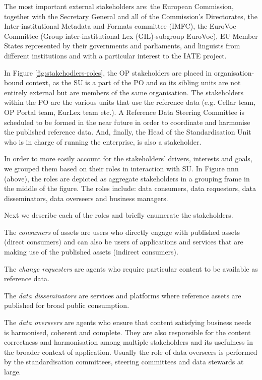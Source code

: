 	The most important external stakeholders are: the European Commission, together with the Secretary General and all of the Commission’s Directorates, the Inter-institutional Metadata and Formats committee (IMFC), the EuroVoc Committee (Group inter-institutional Lex (GIL)-subgroup EuroVoc), EU Member States represented by their governments and parliaments, and linguists from different institutions and with a particular interest to the IATE project.
	 
	In Figure \ref{fig:stakehodlers-roles}, the OP stakeholders are placed in organisation-bound context, as the SU is a part of the PO and so its sibling units are not entirely external but are members of the same organisation. The stakeholders within the PO are the various units that use the reference data (e.g. Cellar team, OP Portal team, EurLex team etc.). A Reference Data Steering Committee is scheduled to be formed in the near future in order to coordinate and harmonise the published reference data. And, finally, the Head of the Standardisation Unit who is in charge of running the enterprise, is also a stakeholder.
	 
	In order to more easily account for the stakeholders' drivers, interests and goals, we grouped them based on their roles in interaction with SU. In Figure nnn (above), the roles are depicted as aggregate stakeholders in a grouping frame in the middle of the figure. The roles include: data consumers, data requestors, data disseminators, data overseers and business managers. 
	
	Next we describe each of the roles and briefly enumerate the stakeholders.
	 
	The \textit{consumers} of assets are users who directly engage with published assets (direct consumers) and can also be users of applications and services that are making use of the published assets (indirect consumers).
	
	The \textit{change requesters} are agents who require particular content to be available as reference data. 
	
	The \textit{data disseminators} are services and platforms where reference assets are published for broad public consumption.
	
	The \textit{data overseers} are agents who ensure that content satisfying business needs is harmonised, coherent and complete. They are also responsible for the content correctness and harmonisation among multiple stakeholders and its usefulness in the broader context of application. Usually the role of data overseers is performed by the standardisation committees, steering committees and data stewards at large.
	
